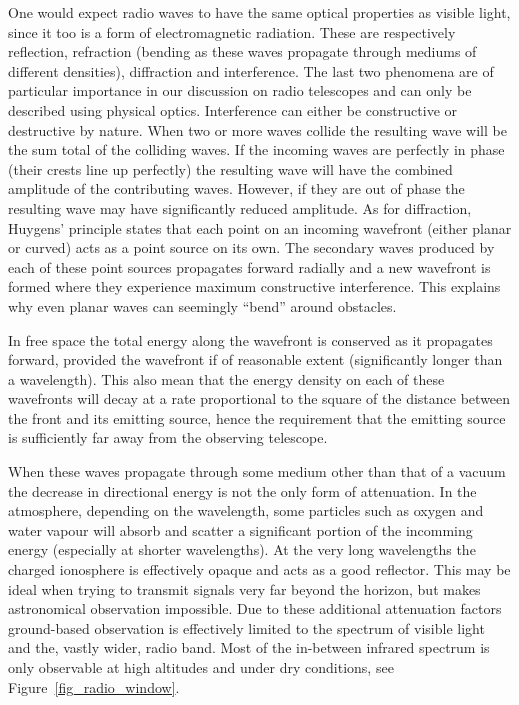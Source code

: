 \documentclass[a4paper,10pt]{report}
\begin{document}
One would expect radio waves to have the same optical properties as visible light, since it too is a form of electromagnetic radiation. These are respectively reflection, refraction (bending as these waves propagate
through mediums of different densities), diffraction and interference. The last two phenomena are of particular importance in our discussion on radio telescopes and can only be described using
physical optics. Interference can either be constructive or destructive by nature. When two or more waves collide the resulting wave will be the sum total of the colliding waves. If the incoming waves are perfectly 
in phase (their crests line up perfectly) the resulting wave will have the combined amplitude of the contributing waves. However, if they are out of phase the resulting wave may have significantly reduced amplitude. 
As for diffraction, Huygens' principle states that each point on an incoming wavefront (either planar or curved) acts as a point source on its own. The secondary waves produced by each of these point sources 
propagates forward radially and a new wavefront is formed where they experience maximum constructive interference. This explains why even planar waves can seemingly ``bend'' around obstacles.

In free space the total energy along the wavefront is conserved as it propagates forward, provided 
the wavefront if of reasonable extent (significantly longer than a wavelength). This also mean that the energy density 
on each of these wavefronts will decay at a rate proportional to the square of the distance between the front and its emitting source, hence
the requirement that the emitting source is sufficiently far away from the observing telescope. 

When these waves propagate through some medium other than that of a vacuum the decrease in directional energy is not the only form of attenuation. In the 
atmosphere, depending on the wavelength, some particles such as oxygen and water vapour will absorb and scatter a significant portion of the incomming 
energy (especially at shorter wavelengths). At the very long wavelengths the charged ionosphere is effectively opaque and acts as a good reflector. This may 
be ideal when trying to transmit signals very far beyond the horizon, but makes astronomical observation impossible.  Due to these additional attenuation 
factors ground-based observation is effectively limited to the spectrum of visible light and the, vastly wider, radio band. Most of the in-between 
infrared spectrum is only observable at high altitudes and under dry conditions, see Figure~\ref{fig_radio_window}. 
\end{document}
